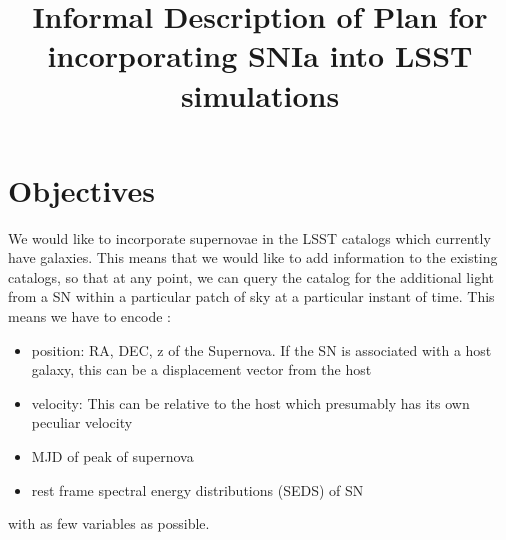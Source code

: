 \documentclass{article}[12pt]
\title{Informal Description of Plan for incorporating SNIa into LSST simulations}
\begin{document}
\maketitle
\section{Objectives}
We would like to incorporate supernovae in the LSST catalogs which currently have galaxies. This means that we would like to add information to the existing catalogs, so that at any point, we can query the catalog for the additional light 
from a SN within a particular patch of sky at a particular instant of time. 
This means we have to encode :
\begin{itemize}
\item position: RA, DEC, z of the Supernova. If the SN is associated with a host galaxy, this can be a displacement vector from the host
\item velocity: This can be relative to the host which presumably has its own peculiar velocity 
\item MJD of peak of supernova 
\item rest frame spectral energy distributions (SEDS) of SN
\end{itemize}
with as few variables as possible. 
\end{document}
